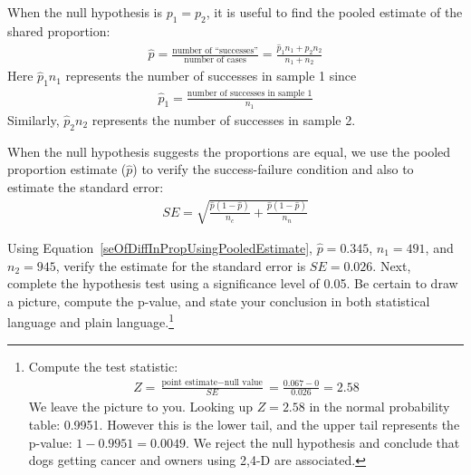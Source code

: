 \begin{termBox}{
When the null hypothesis is $p_1 = p_2$, it is useful to find the pooled estimate of the shared proportion:
\begin{eqnarray*}
\hat{p} = \frac{\text{number of ``successes''}}{\text{number of cases}} = \frac{\hat{p}_1n_1 + \hat{p}_2n_2}{n_1 + n_2}
\end{eqnarray*}
Here $\hat{p}_1n_1$ represents the number of successes in sample 1 since
\begin{eqnarray*}
\hat{p}_1 = \frac{\text{number of successes in sample 1}}{n_1}
\end{eqnarray*}
Similarly, $\hat{p}_2n_2$ represents the number of successes in sample 2.}
\end{termBox}

\begin{tipBox}{
When the null hypothesis suggests the proportions are equal, we use the pooled proportion estimate ($\hat{p}$) to verify the success-failure condition and also to estimate the standard error:
\begin{eqnarray}
SE = \sqrt{\frac{\hat{p}(1-\hat{p})}{n_c} + \frac{\hat{p}(1-\hat{p})}{n_n}} 
\label{seOfDiffInPropUsingPooledEstimate}
\end{eqnarray}}
\end{tipBox}

\begin{exercise}\label{verifySEOfPooledEstimateOf24DWithCancerNoCancerDogs}
Using Equation~\eqref{seOfDiffInPropUsingPooledEstimate}, $\hat{p}=0.345$, $n_1 = 491$, and $n_2=945$, verify the estimate for the standard error is $SE = 0.026$. Next, complete the hypothesis test using a significance level of 0.05. Be certain to draw a picture, compute the p-value, and state your conclusion in both statistical language and plain language.\footnote{Compute the test statistic:
\begin{eqnarray*}
Z = \frac{\text{point estimate} - \text{null value}}{SE} = \frac{0.067 - 0}{0.026} = 2.58
\end{eqnarray*}
We leave the picture to you. Looking up $Z=2.58$ in the normal probability table: 0.9951. However this is the lower tail, and the upper tail represents the p-value: $1-0.9951 = 0.0049$. We reject the null hypothesis and conclude that dogs getting cancer and owners using 2,4-D are associated.}
\end{exercise}


